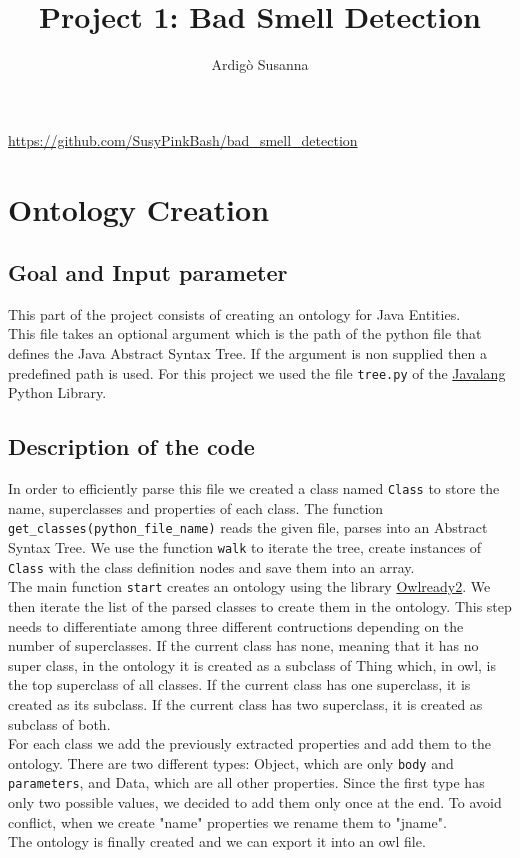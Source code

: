 \documentclass [14 pt]{article}
\title{Project 1: Bad Smell Detection}
\author{Ardig\`o Susanna}
\begin{document}
\pagestyle{fancy}
\fancyhf{}
\cfoot{\thepage}

\begin{titlingpage}
\maketitle
\centering
\url{https://github.com/SusyPinkBash/bad_smell_detection}
\end{titlingpage}

\newpage\thispagestyle{plain}
\tableofcontents
\newpage

\section{Ontology Creation} %
\subsection{Goal and Input parameter}
This part of the project consists of creating an ontology for Java Entities.\\
This file takes an optional argument which is the path of the python file that defines the Java Abstract Syntax Tree. If the argument is non supplied then a predefined path is used. For this project we used the file \texttt{tree.py} of the \href{https://github.com/c2nes/javalang}{Javalang} Python Library. 

\subsection{Description of the code}
In order to efficiently parse this file we created a class named \texttt{Class} to store the name, superclasses and properties of each class.
The function \texttt{get\_classes(python\_file\_name)} reads the given file, parses into an Abstract Syntax Tree. We use the function \texttt{walk} to iterate the tree, create instances of \texttt{Class} with the class definition nodes and save them into an array.\\
The main function \texttt{start} creates an ontology using the library \href{https://pythonhosted.org/Owlready2/}{Owlready2}. We then iterate the list of the parsed classes to create them in the ontology. This step needs to differentiate among three different contructions depending on the number of superclasses.
If the current class has none, meaning that it has no super class, in the ontology it is created as a subclass of Thing which, in owl, is the top superclass of all classes.
If the current class has one superclass, it is created as its subclass.
If the current class has two superclass, it is created as subclass of both.\\
For each class we add the previously extracted properties and add them to the ontology. There are two different types: 
Object, which are only \texttt{body} and \texttt{parameters}, and Data, which are all other properties.
Since the first type has only two possible values, we decided to add them only once at the end. To avoid conflict, when we create "name" properties we rename them to "jname".\\
The ontology is finally created and we can export it into an owl file.
\end{document}
